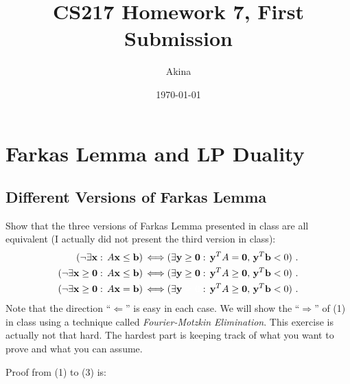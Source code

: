 \documentclass[11pt,a4paper,oneside]{article}
\newcommand{\y}{\mathbf{y}}
\newcommand{\x}{\mathbf{x}}
\renewcommand{\b}{\mathbf{b}}
\newcommand{\zero}{\mathbf{0}}
\renewcommand{\hwtitle} {CS217 Homework 7, First Submission}
\renewcommand{\hwauthor}{Akina}
\renewcommand{\hwdate}{\today}
\begin{document}
\title{\hwtitle}
\author{\hwauthor}
\date{\hwdate}
\maketitle


\section{Farkas Lemma and LP Duality}

\subsection{Different Versions of Farkas Lemma}

\begin{problem}{1}
	\statement
 Show that the three versions of Farkas Lemma presented in class are all equivalent (I actually did not present
 the third version in class):
 \begin{align}
   ( \neg \exists \x : \, A \x \leq \b ) \, & \Longleftrightarrow 
    ( \exists \y \geq \zero : \, \y^T A = \zero, \,     \y^T \b < 0 ) \ . \\
      ( \neg \exists \x \geq \zero : \, A \x \leq \b ) \, & \Longleftrightarrow 
    ( \exists \y \geq \zero : \, \y^T A \geq \zero, \,  \y^T \b < 0 ) \ . \\
   ( \neg \exists \x \geq \zero : \, A \x = \b ) \, & \Longleftrightarrow 
    ( \exists \y \begingroup \color{white} \geq \zero \endgroup : \, \y^T A \geq \zero, \,  \y^T \b < 0 ) \ .
 \end{align}
  Note that the direction ``$\Longleftarrow$'' is easy in each case. 
  We will show the ``$\Longrightarrow$'' of (1) in class using a technique called {\em Fourier-Motzkin Elimination}. 
  This exercise is actually not that hard. The hardest part is keeping track of what you 
  want to prove and what you can assume.
    
    \solution
	Proof from (1) to (3) is:
	

\end{problem}
\end{document}
